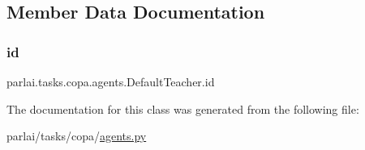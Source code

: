 \subsection{Member Data Documentation}
\mbox{\label{classparlai_1_1tasks_1_1copa_1_1agents_1_1DefaultTeacher_aa8f1b5e4b4493e80ed37fd6cb5d3b696}} 
\subsubsection{\texorpdfstring{id}{id}}
{\footnotesize\ttfamily parlai.\+tasks.\+copa.\+agents.\+Default\+Teacher.\+id}



The documentation for this class was generated from the following file\+:\begin{DoxyCompactItemize}
\item 
parlai/tasks/copa/\hyperlink{parlai_2tasks_2copa_2agents_8py}{agents.\+py}\end{DoxyCompactItemize}
